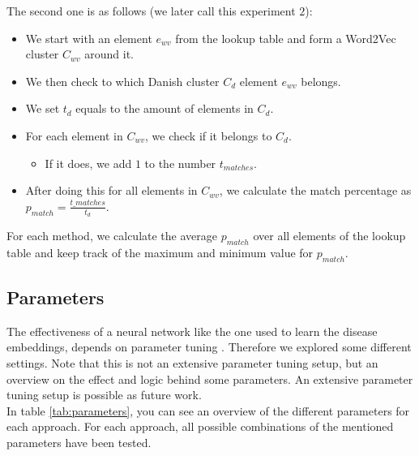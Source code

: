 \noindent The second one is as follows (we later call this experiment $2$):

\begin{itemize}

\item We start with an element $e_{wv}$ from the lookup table and form a Word2Vec cluster $C_{wv}$ around it.
\item We then check to which Danish cluster $C_d$ element $e_{wv}$ belongs.
\item We set $t_{d}$ equals to the amount of elements in $C_d$.
\item For each element in $C_{wv}$, we check if it belongs to $C_d$.
\begin{itemize}
\item If it does, we add $1$ to the number $t_{matches}$.
\end{itemize}
\item After doing this for all elements in $C_{wv}$, we calculate the match percentage as $p_{match} = \frac{t\_{matches}}{t_{d}}$.

\end{itemize}

For each method, we calculate the average $p_{match}$ over all elements of the lookup table and keep track of the maximum and minimum value for $p_{match}$.


\subsection{Parameters}
\label{sec:parameters}

The effectiveness of a neural network like the one used to learn the disease embeddings, depends on parameter tuning \cite{tuning:article}. Therefore we explored some different settings. Note that this is not an extensive parameter tuning setup, but an overview on the effect and logic behind some parameters. An extensive parameter tuning setup is possible as future work. \\

In table \ref{tab:parameters}, you can see an overview of the different parameters for each approach. For each approach, all possible combinations of the mentioned parameters have been tested. \\

